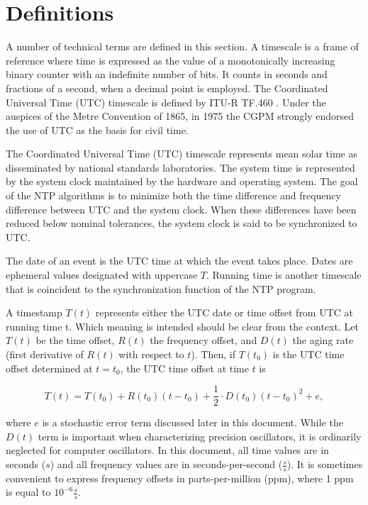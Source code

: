 \chapter{Definitions}

A number of technical terms are defined in this section. A timescale
is a frame of reference where time is expressed as the value of a
monotonically increasing binary counter with an indefinite number of
bits. It counts in seconds and fractions of a second, when a decimal
point is employed. The Coordinated Universal Time (UTC) timescale is
defined by ITU-R TF.460 \cite{ITU-R TF.460}. Under the auspices of the
Metre Convention of 1865, in 1975 the CGPM \cite{CGPM} strongly endorsed
the use of UTC as the basis for civil time.

The Coordinated Universal Time (UTC) timescale represents mean solar
time as disseminated by national standards laboratories. The system
time is represented by the system clock maintained by the hardware
and operating system. The goal of the NTP algorithms is to minimize
both the time difference and frequency difference between UTC and the
system clock. When these differences have been reduced below nominal
tolerances, the system clock is said to be synchronized to UTC.

The date of an event is the UTC time at which the event takes place.
Dates are ephemeral values designated with uppercase $ T $. Running time
is another timescale that is coincident to the synchronization
function of the NTP program.

A timestamp $ T(t) $ represents either the UTC date or time offset from
UTC at running time t. Which meaning is intended should be clear
from the context. Let $ T(t) $ be the time offset, $ R(t) $ the frequency
offset, and $ D(t) $ the aging rate (first derivative of $ R(t) $ with
respect to $ t $). Then, if $ T(t_0) $ is the UTC time offset determined at
$ t = t_0 $, the UTC time offset at time $ t $ is

$$
T(t) = T(t_0) + R(t_0)(t - t_0) + \frac{1}{2} \cdot D(t_0)(t - t_0)^2 + e,
$$

where $ e $ is a stochastic error term discussed later in this document.
While the $ D(t) $ term is important when characterizing precision
oscillators, it is ordinarily neglected for computer oscillators. In
this document, all time values are in seconds ($ s $) and all frequency
values are in seconds-per-second ($ \frac{s}{s} $). It is sometimes convenient
to express frequency offsets in parts-per-million (ppm), where 1 ppm
is equal to $ 10^{-6} \frac{s}{s} $.

